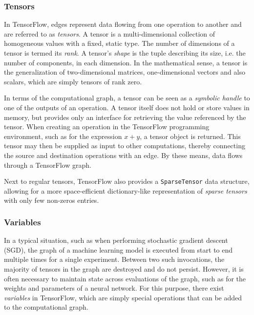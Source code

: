\subsubsection{Tensors}\label{sec:model-graphs-tensors}

In TensorFlow, edges represent data flowing from one operation to another and
are referred to as \emph{tensors}. A tensor is a multi-dimensional collection of
homogeneous values with a fixed, static type. The number of dimensions of a
tensor is termed its \emph{rank}. A tensor's \emph{shape} is the tuple
describing its size, i.e. the number of components, in each dimension. In the
mathematical sense, a tensor is the generalization of two-dimensional matrices,
one-dimensional vectors and also scalars, which are simply tensors of rank zero.

In terms of the computational graph, a tensor can be seen as a \emph{symbolic
  handle} to one of the outputs of an operation. A tensor itself does not hold
or store values in memory, but provides only an interface for retrieving the
value referenced by the tensor. When creating an operation in the TensorFlow
programming environment, such as for the expression $x + y$, a tensor object is
returned. This tensor may then be supplied as input to other computations,
thereby connecting the source and destination operations with an edge. By these
means, data flows through a TensorFlow graph.

Next to regular tensors, TensorFlow also provides a \texttt{SparseTensor}
data structure, allowing for a more space-efficient dictionary-like
representation of \emph{sparse tensors} with only few non-zeros entries.

\subsubsection{Variables}\label{sec:model-graphs-vars}

In a typical situation, such as when performing stochastic gradient descent
(SGD), the graph of a machine learning model is executed from start to end
multiple times for a single experiment. Between two such invocations, the
majority of tensors in the graph are destroyed and do not persist. However, it
is often necessary to maintain state across evaluations of the graph, such as
for the weights and parameters of a neural network. For this purpose, there
exist \emph{variables} in TensorFlow, which are simply special operations that
can be added to the computational graph.

